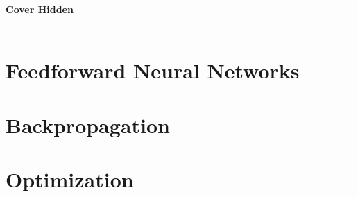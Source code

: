 \documentclass[11pt,fleqn,oneside]{book} %
\newcommand{\AUTHOR}{Federico Brancasi}
\newcommand{\DATE}{\today}
\newcommand{\TITLE}{Deep Learning}
\newcommand{\SUBTITLE}{University of Trento}
\newcommand{\SUBJECT}{Demo}
\renewcommand{\coverpage}[5]{{\Huge\textbf{Cover Hidden}}
    \textcolor{white}{#1, #2, #3, #4, #5}}
\begin{document}

\coverpage{\TITLE}{\SUBTITLE}{\AUTHOR}{\DATE}{\SUBJECT}

\newpage
\tableofcontents


\newpage
\chapter{Feedforward Neural Networks} 


\newpage
\chapter{Backpropagation} 


\newpage
\chapter{Optimization}


\newpage \ \newpage

\listoffigures
\listoftables

\end{document}
